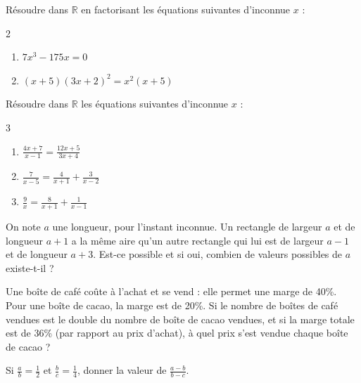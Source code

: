 \documentclass[main.tex]{subfiles}
\begin{document}
\begin{problem}\label{chapter07:problem:07} 
Résoudre dans $\mathbb{R}$ en factorisant   les équations suivantes d'inconnue $x$ :\vspace{-0.5em}
\begin{multicols}{2}
\begin{enumerate}[label={$(E_\arabic*)$},leftmargin=*]
\item $7x^3-175x=0$
\item $(x+5)(3x+2)^2=x^2(x+5)$ 
\end{enumerate}
\end{multicols} 
\end{problem}
\begin{problem}\label{chapter07:problem:08} 
Résoudre dans $\mathbb{R}$   les équations suivantes d'inconnue $x$ :\vspace{-0.5em}
\begin{multicols}{3}
\begin{enumerate}[label={$(E_\arabic*)$},leftmargin=*]
\item $\frac{4x+7}{x-1}=\frac{12x+5}{3x+4}$
\item $\frac{7}{x-5}=\frac{4}{x+1} +\frac{3}{x-2}$ 
\item $\frac{9}{x}=\frac{8}{x+1}+\frac{1}{x-1}$ 
\end{enumerate}
\end{multicols} 
\end{problem}
\begin{problem}\label{chapter07:problem:09}  
On note $a$ une longueur, pour l’instant inconnue. Un rectangle de largeur $a$ et de longueur
$a+1$ a la même aire qu’un autre rectangle qui lui est de largeur $a−1$ et de longueur $a+3$. Est-ce possible et si oui, combien de valeurs possibles de $a$ existe-t-il ?
\end{problem}
\begin{problem}\label{chapter07:problem:10} 
Une boîte de café coûte  à l'achat et se vend  : elle permet une marge de 40\%.\\
Pour une boîte de cacao, la marge est de 20\%. Si le nombre de boîtes de café vendues est le double du nombre de boîte de cacao vendues, et si la marge totale est de 36\% (par rapport au prix d'achat), à quel prix s'est vendue chaque boîte de cacao ? 
\end{problem} 
\begin{problem}\label{chapter07:problem:11} 
Si $\frac{a}{b}=\frac{1}{2}$ et $\frac{b}{c}=\frac{1}{4}$, donner la valeur de $\frac{a-b}{b-c}$.

\end{problem} 
\end{document}
